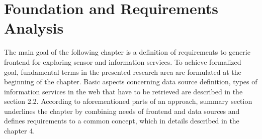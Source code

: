 \chapter{Foundation and Requirements Analysis}
	The main goal of the following chapter is a definition of requirements to generic frontend for exploring sensor and information services. To achieve formalized goal, fundamental terms in the presented research area are formulated at the beginning of the chapter. Basic aspects concerning data source definition, types of information services in the web that have to be retrieved are described in the section 2.2. According to aforementioned parts of an approach, summary section underlines the chapter by combining needs of frontend and data sources and defines requirements to a common concept, which in details described in the chapter 4.

